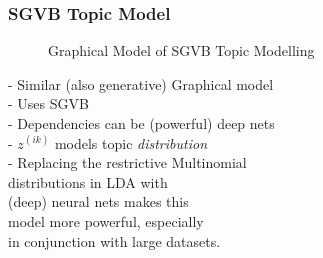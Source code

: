 \documentclass{beamer}
\begin{document}
\begin{frame}
\frametitle{SGVB Topic Model}
\begin{wrapfigure}[0]{r}{0.5\textwidth}
  \centering

\caption{Graphical Model of SGVB Topic Modelling}
\label{sgvb_topic}
\end{wrapfigure}


- Similar (also generative) Graphical model\\
- Uses SGVB \\ 
- Dependencies can be (powerful) deep nets \\
- $z^{(ik)}$ models topic \textit{distribution} \\
- Replacing the restrictive Multinomial \\
\hspace{2mm} distributions in LDA with \\
\hspace{2mm} (deep) neural nets makes this \\
\hspace{2mm} model more powerful, especially \\
\hspace{2mm} in conjunction with large datasets.
\vspace{70mm}
\end{frame}
\end{document}
